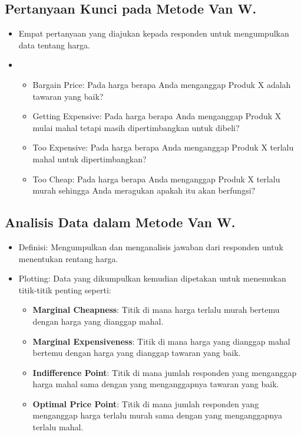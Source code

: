 \documentclass{article}
\begin{document}
\subsection{Pertanyaan Kunci pada Metode Van W.}
\begin{itemize}
    \item Empat pertanyaan yang diajukan kepada responden untuk mengumpulkan data tentang harga.
    \item \begin{itemize}
              \item Bargain Price: Pada harga berapa Anda menganggap Produk X adalah tawaran yang baik?
              \item Getting Expensive: Pada harga berapa Anda menganggap Produk X mulai mahal tetapi masih dipertimbangkan untuk dibeli?
              \item Too Expensive: Pada harga berapa Anda menganggap Produk X terlalu mahal untuk dipertimbangkan?
              \item Too Cheap: Pada harga berapa Anda menganggap Produk X terlalu murah sehingga Anda meragukan apakah itu akan berfungsi?
          \end{itemize}
\end{itemize}

\subsection{Analisis Data dalam Metode Van W.}
\begin{itemize}
    \item Definisi: Mengumpulkan dan menganalisis jawaban dari responden untuk menentukan rentang harga.
    \item Plotting: Data yang dikumpulkan kemudian dipetakan untuk menemukan titik-titik penting seperti:
          \begin{itemize}
              \item \textbf{Marginal Cheapness}: Titik di mana harga terlalu murah bertemu dengan harga yang dianggap mahal.
              \item \textbf{Marginal Expensiveness}: Titik di mana harga yang dianggap mahal bertemu dengan harga yang dianggap tawaran yang baik.
              \item \textbf{Indifference Point}: Titik di mana jumlah responden yang menganggap harga mahal sama dengan yang menganggapnya tawaran yang baik.
              \item \textbf{Optimal Price Point}: Titik di mana jumlah responden yang menganggap harga terlalu murah sama dengan yang menganggapnya terlalu mahal.
          \end{itemize}
\end{itemize}
\end{document}
